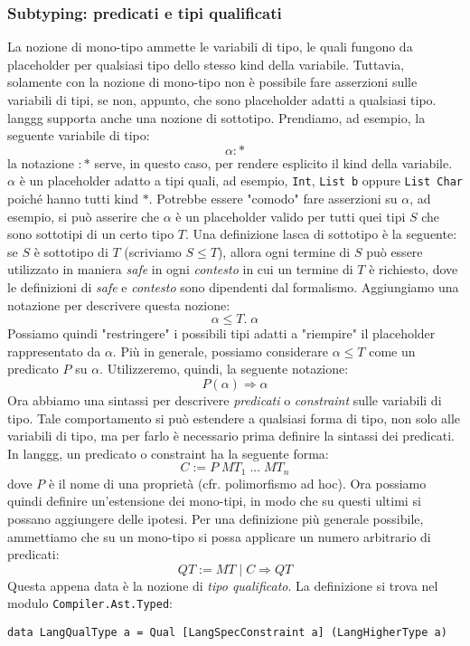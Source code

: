 \documentclass[10pt,a4paper]{article}
\begin{document}
\subsubsection{Subtyping: predicati e tipi qualificati}
La nozione di mono-tipo ammette le variabili di tipo, le quali fungono da placeholder per qualsiasi tipo dello stesso
kind della variabile. Tuttavia, solamente con la nozione di mono-tipo non è possibile fare asserzioni sulle variabili
di tipi, se non, appunto, che sono placeholder adatti a qualsiasi tipo. langgg supporta anche una nozione di sottotipo.
Prendiamo, ad esempio, la seguente variabile di tipo:
\[ \alpha : * \]
la notazione $ : * $ serve, in questo caso, per rendere esplicito il kind della variabile. $ \alpha $ è un placeholder
adatto a tipi quali, ad esempio, \texttt{Int}, \texttt{List b} oppure \texttt{List Char} poiché hanno tutti kind $ * $.
Potrebbe essere "comodo" fare asserzioni su $ \alpha $, ad esempio, si può asserire che $ \alpha $ è un placeholder
valido per tutti quei tipi $ S $ che sono sottotipi di un certo tipo $ T $. Una definizione lasca di sottotipo è la
seguente: se $ S $ è sottotipo di $ T $ (scriviamo $ S \leq T $), allora ogni termine di $ S $ può essere utilizzato
in maniera \textit{safe} in ogni \textit{contesto} in cui un termine di $ T $ è richiesto, dove le definizioni di
\textit{safe} e \textit{contesto} sono dipendenti dal formalismo.
Aggiungiamo una notazione per descrivere questa nozione:
\[ \alpha \leq T . \; \alpha \]
Possiamo quindi "restringere" i possibili tipi adatti a "riempire" il placeholder rappresentato da $ \alpha $. Più in
generale, possiamo considerare $ \alpha \leq T $ come un predicato $ P $ su $ \alpha $. Utilizzeremo, quindi, la seguente
notazione:
\[ P(\alpha) \Rightarrow \alpha \]
Ora abbiamo una sintassi per descrivere \textit{predicati} o \textit{constraint} sulle variabili di tipo. Tale
comportamento si può estendere a qualsiasi forma di tipo, non solo alle variabili di tipo, ma per farlo è necessario
prima definire la sintassi dei predicati. In langgg, un predicato o constraint ha la seguente forma:
\[ C := P \; MT_1 \; ... \; MT_n \]
dove $ P $ è il nome di una proprietà (cfr. polimorfismo ad hoc). Ora possiamo quindi definire un'estensione dei
mono-tipi, in modo che su questi ultimi si possano aggiungere delle ipotesi. Per una definizione più generale possibile,
ammettiamo che su un mono-tipo si possa applicare un numero arbitrario di predicati:
\[ QT := MT \; | \; C \Rightarrow QT \]
Questa appena data è la nozione di \textit{tipo qualificato}. La definizione si trova nel modulo
\texttt{Compiler.Ast.Typed}:
\begin{lstlisting}
data LangQualType a = Qual [LangSpecConstraint a] (LangHigherType a)
\end{lstlisting}
\end{document}
